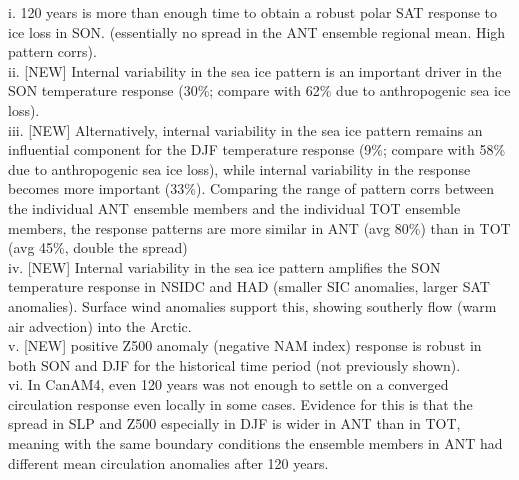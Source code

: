 \documentclass[twocol]{ametsoc}
\begin{document}
i. 120 years is more than enough time to obtain a robust polar SAT response to ice loss in SON. (essentially no spread in the ANT ensemble regional mean. High pattern corrs). \\
ii. [NEW] Internal variability in the sea ice pattern is an important driver in the SON temperature response (30\%; compare with 62\% due to anthropogenic sea ice loss).\\%
iii. [NEW] Alternatively, internal variability in the sea ice pattern remains an influential component for the DJF temperature response (9\%; compare with 58\% due to anthropogenic sea ice loss), while internal variability in the response becomes more important (33\%). Comparing the range of pattern corrs between the individual ANT ensemble members and the individual TOT ensemble members, the response patterns are more similar in ANT (avg 80\%) than in TOT (avg 45\%, double the spread) \\
iv. [NEW] Internal variability in the sea ice pattern amplifies the SON temperature response in NSIDC and HAD (smaller SIC anomalies, larger SAT anomalies). Surface wind anomalies support this, showing southerly flow (warm air advection) into the Arctic.\\
v. [NEW] positive Z500 anomaly (negative NAM index) response is robust in both SON and DJF for the historical time period (not previously shown).\\
vi. In CanAM4, even 120 years was not enough to settle on a converged circulation response even locally in some cases. Evidence for this is that the spread in SLP and Z500 especially in DJF is wider in ANT than in TOT, meaning with the same boundary conditions the ensemble members in ANT had different mean circulation anomalies after 120 years.\\
\end{document}
